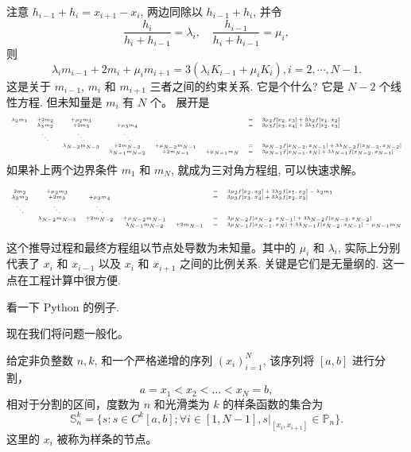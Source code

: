 \documentclass[a4paper]{ctexart}
\begin{document}
{注意 $h_{i - 1} + h_i = x_{i + 1} - x_i$, 两边同除以 $h_{i - 1} + h_i$, 
并令
$$
\frac{h_i}{h_i + h_{i - 1}} = \lambda_i, 
\quad \frac{h_{i - 1}}{h_i + h_{i - 1}} = \mu_i,
$$
则
$$
\lambda_i m_{i - 1} + 2m_i + \mu_i m_{i + 1} 
= 3 (\lambda_i K_{i - 1} + \mu_i K_i), i = 2, \cdots, N - 1.
$$
这是关于 $m_{i - 1}$, $m_i$ 和 $m_{i + 1}$ 三者之间的约束关系. 
它是个什么? 它是 $N - 2$ 个线性方程. 但未知量是 $m_i$ 有 $N$ 个。
展开是
$$
\tiny
\begin{array}{cccccccl}
  \lambda_2 m_1 &+ 2 m_2 &+ \mu_2 m_3 &&&&=& 3 \mu_2 f[x_2, x_3] + 3 \lambda_2 f[x_1, x_2] \\
  &\lambda_3 m_2 &+ 2 m_3 &+ \mu_3 m_4 &&&=& 3 \mu_3 f[x_3, x_4] + 3 \lambda_3 f[x_2, x_3] \\
  &\ddots&\ddots&\ddots&&&&\\
  &&\lambda_{N - 2} m_{N - 3} &+ 2 m_{N - 2} &+ \mu_{N - 2} m_{N - 1} &&=& 3 \mu_{N - 2} f[x_{N - 2}, x_{N - 1}] + 3 \lambda_{N - 2} f[x_{N - 3}, x_{N - 2}] \\
  &&&\lambda_{N - 1} m_{N - 2} &+ 2 m_{N - 1} &+ \mu_{N - 1} m_N &=& 3 \mu_{N - 1} f[x_{N - 1}, x_N] + 3 \lambda_{N - 1} f[x_{N - 2}, x_{N - 1}] 
\end{array}
$$
如果补上两个边界条件 $m_1$ 和 $m_N$, 
就成为三对角方程组, 可以快速求解。

$$
\tiny
\begin{array}{ccccccl}
  2 m_2 &+ \mu_2 m_3 &&&&=& 3 \mu_2 f[x_2, x_3] + 3 \lambda_2 f[x_1, x_2] - \lambda_2 m_1\\
  \lambda_3 m_2 &+ 2 m_3 &+ \mu_3 m_4 &&&=& 3 \mu_3 f[x_3, x_4] + 3 \lambda_3 f[x_2, x_3] \\
  \ddots&\ddots&\ddots&&&&\\
  &\lambda_{N - 2} m_{N - 3} &+ 2 m_{N - 2} &+ \mu_{N - 2} m_{N - 1} &&=& 3 \mu_{N - 2} f[x_{N - 2}, x_{N - 1}] + 3 \lambda_{N - 2} f[x_{N - 3}, x_{N - 2}] \\
  &&&\lambda_{N - 1} m_{N - 2} &+ 2 m_{N - 1} &=& 3 \mu_{N - 1} f[x_{N - 1}, x_N] + 3 \lambda_{N - 1} f[x_{N - 2}, x_{N - 1}] - \mu_{N - 1} m_N 
\end{array}
$$


这个推导过程和最终方程组以节点处导数为未知量。其中的 $\mu_i$ 和 $\lambda_i$, 
实际上分别代表了 $x_i$ 和 $x_{i - 1}$ 以及 $x_i$ 和 $x_{i + 1}$ 
之间的比例关系. 关键是它们是无量纲的. 这一点在工程计算中很方便. 

看一下 Python 的例子.

现在我们将问题一般化。

给定非负整数 $n, k$, 和一个严格递增的序列 $(x_i)_{i=1}^{N}$, 该序列将 $[a, b]$ 进行分割，
$$
  a = x_1 < x_2 < \ldots < x_N = b,
$$
相对于分割的区间，度数为 $n$ 和光滑类为 $k$ 的样条函数的集合为
$$
  \mathbb{S}^k_n = \{s : s \in C^k [a, b]; \forall i \in [1, N - 1], 
  s|_{[x_i, x_{i + 1}]} \in \mathbb{P}_n \}.
$$
这里的 $x_i$ 被称为样条的节点。  

}
\end{document}
